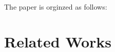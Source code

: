 \documentclass[journal,article,submit,moreauthors,pdftex,10pt,a4paper]{mdpi}
\begin{document}
The paper is orginzed as follows: 

\section{Related Works}
\end{document}

